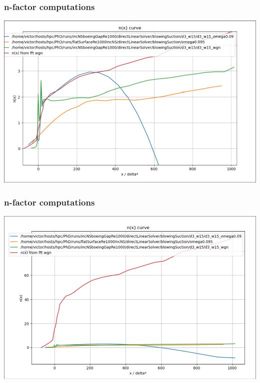 \documentclass[
  aspectratio=169, %
  t, %
  onlytextwidth, %
  10pt, %
]{beamer}
\begin{document}
\begin{frame}
  \frametitle{n-factor computations}

  \centering
  \includegraphics[width=0.75\linewidth]{Images/nfactor.png}
  
\end{frame}
\begin{frame}
  \frametitle{n-factor computations}

  \centering
  \includegraphics[width=0.75\linewidth]{Images/nfactor_big.png}
  
\end{frame}
\end{document}
